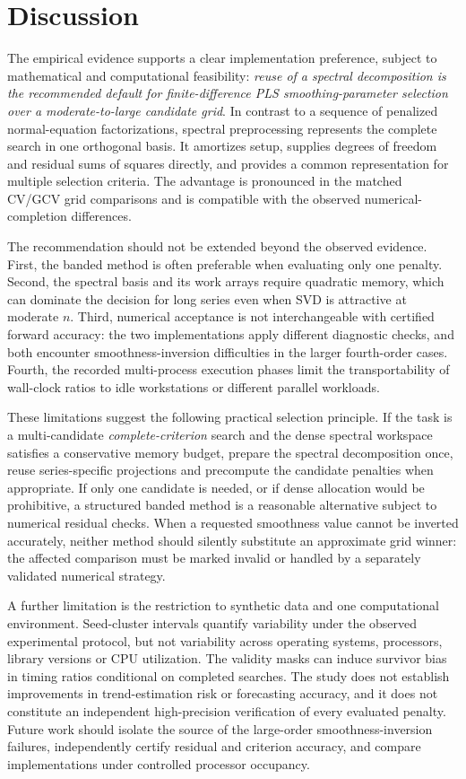 \section{Discussion}
The empirical evidence supports a clear implementation preference, subject to mathematical and computational feasibility: \emph{reuse of a spectral decomposition is the recommended default for finite-difference PLS smoothing-parameter selection over a moderate-to-large candidate grid}. In contrast to a sequence of penalized normal-equation factorizations, spectral preprocessing represents the complete search in one orthogonal basis. It amortizes setup, supplies degrees of freedom and residual sums of squares directly, and provides a common representation for multiple selection criteria. The advantage is pronounced in the matched CV/GCV grid comparisons and is compatible with the observed numerical-completion differences.

The recommendation should not be extended beyond the observed evidence. First, the banded method is often preferable when evaluating only one penalty. Second, the spectral basis and its work arrays require quadratic memory, which can dominate the decision for long series even when SVD is attractive at moderate $n$. Third, numerical acceptance is not interchangeable with certified forward accuracy: the two implementations apply different diagnostic checks, and both encounter smoothness-inversion difficulties in the larger fourth-order cases. Fourth, the recorded multi-process execution phases limit the transportability of wall-clock ratios to idle workstations or different parallel workloads.

These limitations suggest the following practical selection principle. If the task is a multi-candidate \emph{complete-criterion} search and the dense spectral workspace satisfies a conservative memory budget, prepare the spectral decomposition once, reuse series-specific projections and precompute the candidate penalties when appropriate. If only one candidate is needed, or if dense allocation would be prohibitive, a structured banded method is a reasonable alternative subject to numerical residual checks. When a requested smoothness value cannot be inverted accurately, neither method should silently substitute an approximate grid winner: the affected comparison must be marked invalid or handled by a separately validated numerical strategy.

A further limitation is the restriction to synthetic data and one computational environment. Seed-cluster intervals quantify variability under the observed experimental protocol, but not variability across operating systems, processors, library versions or CPU utilization. The validity masks can induce survivor bias in timing ratios conditional on completed searches. The study does not establish improvements in trend-estimation risk or forecasting accuracy, and it does not constitute an independent high-precision verification of every evaluated penalty. Future work should isolate the source of the large-order smoothness-inversion failures, independently certify residual and criterion accuracy, and compare implementations under controlled processor occupancy.

